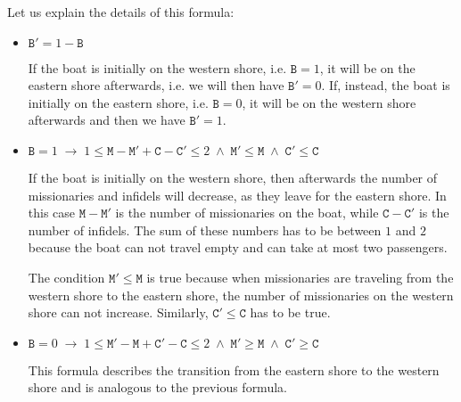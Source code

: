 \begin{enumerate}[(a)]
      Let us explain the details of this formula:
      \begin{itemize}
      \item $\mathtt{B}' = 1 - \mathtt{B}$

            If the boat is initially on the western shore, i.e. $\texttt{B} = 1$, it will be on the eastern
            shore afterwards, i.e. we will then have $\texttt{B}' = 0$.  If, instead, the boat is initially on
            the eastern shore, i.e. $\texttt{B} = 0$, it will be on the western
            shore afterwards and then we have $\texttt{B}' = 1$.
      \item $\mathtt{B} = 1 \;\rightarrow\; 1 \leq \mathtt{M} - \mathtt{M}'  + \mathtt{C} - \mathtt{C}' \leq 2 \;\wedge\;
             \mathtt{M}' \leq \mathtt{M} \;\wedge\; \mathtt{C}' \leq \mathtt{C}$


            If the boat is initially on the western shore, then afterwards the number of missionaries and
            infidels will decrease, as they leave for the eastern shore.  In this case $\texttt{M} - \texttt{M}'$
            is the number of missionaries on the boat, while $\texttt{C} - \texttt{C}'$ is the number of
            infidels.  The sum of these numbers has to be between $1$ and $2$ because the boat can not travel
            empty and can take at most two passengers.

            The condition $\mathtt{M}' \leq \mathtt{M}$ is true because when missionaries are traveling from
            the western shore to the eastern shore, the number of missionaries on the western shore can not
            increase.  Similarly,  $\mathtt{C}' \leq \mathtt{C}$ has to be true.
      \item $\mathtt{B} = 0 \;\rightarrow\; 1 \leq \mathtt{M}' - \mathtt{M}  + \mathtt{C}' - \mathtt{C} \leq 2 \;\wedge\;
            \mathtt{M}' \geq \mathtt{M} \;\wedge\; \mathtt{C}' \geq \mathtt{C}$

            This formula describes the transition from the eastern shore to the western shore and is analogous
            to the previous formula.
      \end{itemize}
\end{enumerate}



